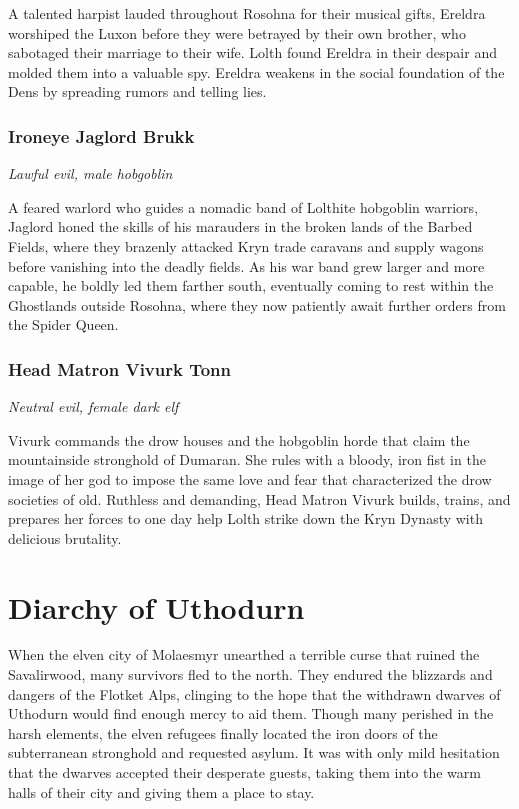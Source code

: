 \documentclass[10pt,a4paper,twoside,bg=print,twocolumn,openany,nodeprecatedcode]{dndbook}
\begin{document}
A talented harpist lauded throughout Rosohna for their musical gifts, Ereldra worshiped the Luxon before they were betrayed by their own brother, who sabotaged their marriage to their wife. Lolth found Ereldra in their despair and molded them into a valuable spy. Ereldra weakens in the social foundation of the Dens by spreading rumors and telling lies.

\subsubsection{Ironeye Jaglord Brukk}
\textit{Lawful evil, male hobgoblin}

A feared warlord who guides a nomadic band of Lolthite hobgoblin warriors, Jaglord honed the skills of his marauders in the broken lands of the Barbed Fields, where they brazenly attacked Kryn trade caravans and supply wagons before vanishing into the deadly fields. As his war band grew larger and more capable, he boldly led them farther south, eventually coming to rest within the Ghostlands outside Rosohna, where they now patiently await further orders from the Spider Queen.

\subsubsection{Head Matron Vivurk Tonn}
\textit{Neutral evil, female dark elf}

Vivurk commands the drow houses and the hobgoblin horde that claim the mountainside stronghold of Dumaran. She rules with a bloody, iron fist in the image of her god to impose the same love and fear that characterized the drow societies of old. Ruthless and demanding, Head Matron Vivurk builds, trains, and prepares her forces to one day help Lolth strike down the Kryn Dynasty with delicious brutality.

\section{Diarchy of Uthodurn}
When the elven city of Molaesmyr unearthed a terrible curse that ruined the Savalirwood, many survivors fled to the north. They endured the blizzards and dangers of the Flotket Alps, clinging to the hope that the withdrawn dwarves of Uthodurn would find enough mercy to aid them. Though many perished in the harsh elements, the elven refugees finally located the iron doors of the subterranean stronghold and requested asylum. It was with only mild hesitation that the dwarves accepted their desperate guests, taking them into the warm halls of their city and giving them a place to stay.
\end{document}
